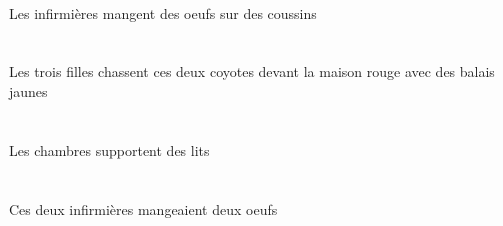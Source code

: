 \begin{exe}
    \INDPlOblG{}   \coussinBPlOblG{}   \SURG{}   \DEFPlErgG{}   \infirmiereAPlErgG{}   \INDPlAbsG{}   \oeufCPlAbsG{}  \mangerVtPrsCPlG{} \\
 Les infirmières mangent des oeufs sur des coussins
\ex\glll
    \INDPlObl{}   \jauneAPl{}   \balaiAPlObl{}   \AVEC{}   \DEFPlErg{}   \troisCPl{}   \filleCPlErg{}   \DEMDuAbs{}    \DEFSgObl{}   \rougeDSg{}   \maisonDSgObl{}   \DEVANT{}   \coyoteCDuAbs{}  \chasserVtPrsCDu{} \\
    \INDPlOblP{}   \jauneAPlP{}   \balaiAPlOblP{}   \AVECP{}   \DEFPlErgP{}   \troisCPlP{}   \filleCPlErgP{}   \DEMDuAbsP{}    \DEFSgOblP{}   \rougeDSgP{}   \maisonDSgOblP{}   \DEVANTP{}   \coyoteCDuAbsP{}  \chasserVtPrsCDuP{} \\
    \INDPlOblG{}   \jauneAPlG{}   \balaiAPlOblG{}   \AVECG{}   \DEFPlErgG{}   \troisCPlG{}   \filleCPlErgG{}   \DEMDuAbsG{}    \DEFSgOblG{}   \rougeDSgG{}   \maisonDSgOblG{}   \DEVANTG{}   \coyoteCDuAbsG{}  \chasserVtPrsCDuG{} \\
 Les trois filles chassent ces deux coyotes devant la maison rouge avec des balais jaunes
\ex\glll
   \DEFPlErg{}   \chambreBPlErg{}   \INDPlAbs{}   \litDPlAbs{}  \supporterVtPrsDPl{} \\
   \DEFPlErgP{}   \chambreBPlErgP{}   \INDPlAbsP{}   \litDPlAbsP{}  \supporterVtPrsDPlP{} \\
   \DEFPlErgG{}   \chambreBPlErgG{}   \INDPlAbsG{}   \litDPlAbsG{}  \supporterVtPrsDPlG{} \\
 Les chambres supportent des lits
\ex\glll
   \DEMDuErg{}   \infirmiereADuErg{}   \INDDuAbs{}   \oeufCDuAbs{}  \mangerVtPstCDu{} \\
   \DEMDuErgP{}   \infirmiereADuErgP{}   \INDDuAbsP{}   \oeufCDuAbsP{}  \mangerVtPstCDuP{} \\
   \DEMDuErgG{}   \infirmiereADuErgG{}   \INDDuAbsG{}   \oeufCDuAbsG{}  \mangerVtPstCDuG{} \\
 Ces deux infirmières mangeaient deux oeufs
\ex\glll
   \INDSgErg{}   \NabilDSgErg{}    \DEFSgDat{}   \grandASg{}   \infirmiereASgDat{}   \INDSgAbs{}   \petitDSg{}   \litDSgAbs{}  \donnerVdPstDSg{} \\
   \INDSgErgP{}   \NabilDSgErgP{}    \DEFSgDatP{}   \grandASgP{}   \infirmiereASgDatP{}   \INDSgAbsP{}   \petitDSgP{}   \litDSgAbsP{}  \donnerVdPstDSgP{} \\
   \INDSgErgG{}   \NabilDSgErgG{}    \DEFSgDatG{}   \grandASgG{}   \infirmiereASgDatG{}   \INDSgAbsG{}   \petitDSgG{}   \litDSgAbsG{}  \donnerVdPstDSgG{} \\

\end{exe}
